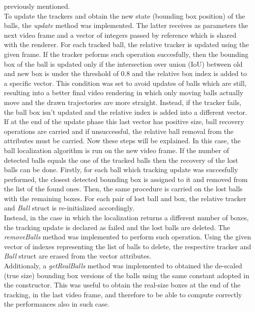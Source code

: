 previously mentioned. 
\newline \\
To update the trackers and obtain the new state (bounding box position) of the balls, the \textit{update} method was implemented. The latter receives as parameters the next 
video frame and a vector of integers passed by reference which is shared with the renderer. For each tracked ball, the relative tracker is updated using the given frame.
If the tracker peforms such operation succesfully, then the bounding box of the ball is updated only if the intersection over union (IoU) between old and new box is under
the threshold of $0.8$ and the relative box index is added to a specific vector. This condition was set to avoid updates of balls which are still, resulting into a better final video rendering in which only moving balls actually move
and the drawn trajectories are more straight. Instead, if the tracker fails, the ball box isn't updated and the relative index is added into a different vector.
\newline \\
If at the end of the update phase this last vector has positive size, ball recovery operations are carried and if unsuccessful, the relative ball removal from the attributes 
must be carried. Now these steps will be explained. In this case, the ball localization algorithm is run on the new video frame. If the number of detected balls equals the one
of the tracked balls then the recovery of the lost balls can be done. Firstly, for each ball which tracking update was succesfully performed, the closest detected bounding box
is assigned to it and removed from the list of the found ones. Then, the same procedure is carried on the lost balls with the remaining boxes. For each pair of lost ball and box,
the relative tracker and \textit{Ball} struct is re-initialized accordingly.
\newline \\
Instead, in the case in which the localization returns a different number of boxes, the tracking update is declared as failed and the lost balls are deleted. 
The \textit{removeBalls} method was implemented to perform such operation. Using the given vector of indexes representing the list of balls to delete, the respective
tracker and \textit{Ball} struct are erased from the vector attributes.
\newline \\
Additionaly, a \textit{getRealBalls} method was implemented to obtained the de-scaled (true size) bounding box versions of the balls using the same constant adopted in
the constructor. This was useful to obtain the real-size boxes at the end of the tracking, in the last video frame, and therefore to be able to compute correctly
the performances also in such case.
